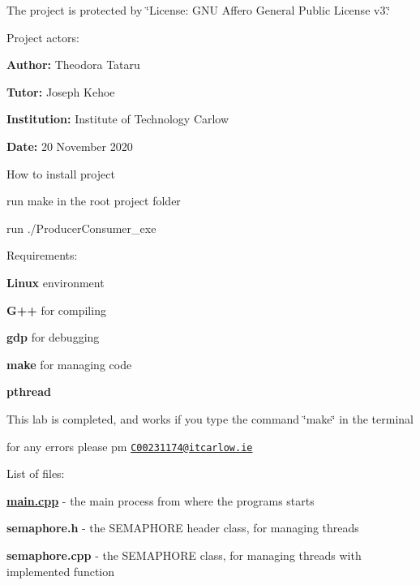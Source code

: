 
\begin{DoxyEnumerate}
\item The project is protected by \char`\"{}\+License\+: G\+N\+U Affero General Public License v3.\char`\"{}
\item Project actors\+:
\begin{DoxyItemize}
\item {\bfseries Author\+:} Theodora Tataru
\item {\bfseries Tutor\+:} Joseph Kehoe
\item {\bfseries Institution\+:} Institute of Technology Carlow
\item {\bfseries Date\+:} 20 November 2020
\end{DoxyItemize}
\item How to install project
\begin{DoxyItemize}
\item run \textquotesingle{}make\textquotesingle{} in the root project folder
\item run ./\+Producer\+Consumer\+\_\+exe
\end{DoxyItemize}
\item Requirements\+:
\begin{DoxyItemize}
\item {\bfseries  Linux } environment
\item {\bfseries  G++ } for compiling
\item {\bfseries  gdp } for debugging
\item {\bfseries  make } for managing code
\item {\bfseries  pthread }
\end{DoxyItemize}
\item This lab is completed, and works if you type the command \char`\"{}make\char`\"{} in the terminal
\begin{DoxyItemize}
\item for any errors please pm \href{mailto:C00231174@itcarlow.ie}{\tt C00231174@itcarlow.\+ie}
\end{DoxyItemize}
\item List of files\+:
\begin{DoxyItemize}
\item {\bfseries \hyperlink{main_8cpp}{main.\+cpp} }-\/ the main process from where the programs starts
\item {\bfseries semaphore.\+h }-\/ the S\+E\+M\+A\+P\+H\+O\+RE header class, for managing threads
\item {\bfseries semaphore.\+cpp }-\/ the S\+E\+M\+A\+P\+H\+O\+RE class, for managing threads with implemented function

\end{DoxyItemize}
\end{DoxyEnumerate}
